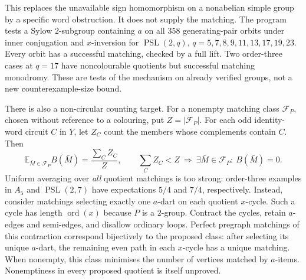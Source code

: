 \documentclass[11pt,a4paper]{article}
\theoremstyle{definition}
\theoremstyle{remark}
\newcommand{\ord}{\operatorname{ord}}
\newcommand{\PSL}{\operatorname{PSL}}
\begin{document}
This replaces the unavailable sign homomorphism on a nonabelian simple group by a specific word obstruction.  It does not supply the matching.  The program  tests a Sylow $2$-subgroup containing $a$ on all $358$ generating-pair orbits under inner conjugation and $x$-inversion for $\PSL(2,q)$, $q=5,7,8,9,11,13,17,19,23$.  Every orbit has a successful matching, checked by a full lift.  Two order-three cases at $q=17$ have noncolourable quotients but successful matching monodromy.  These are tests of the mechanism on already verified groups, not a new counterexample-size bound.

There is also a non-circular counting target.  For a nonempty matching class $\mathcal F_P$, chosen without reference to a colouring, put $Z=|\mathcal F_P|$.  For each odd identity-word circuit $C$ in $Y$, let $Z_C$ count the members whose complements contain $C$.  Then
\[
 \mathbb E_{\bar M\in\mathcal F_P}B(\bar M)
       =\frac{\sum_C Z_C}{Z},\qquad
 \sum_C Z_C<Z\ \Longrightarrow\ \exists\bar M\in\mathcal F_P:\ B(\bar M)=0.
\]
Uniform averaging over \emph{all} quotient matchings is too strong: order-three examples in $A_5$ and $\PSL(2,7)$ have expectations $5/4$ and $7/4$, respectively.  Instead, consider matchings selecting exactly one $a$-dart on each quotient $x$-cycle.  Such a cycle has length $\ord(x)$ because $P$ is a $2$-group.  Contract the cycles, retain $a$-edges and semi-edges, and disallow ordinary loops.  Perfect pregraph matchings of this contraction correspond bijectively to the proposed class: after selecting its unique $a$-dart, the remaining even path in each $x$-cycle has a unique matching.  When nonempty, this class minimises the number of vertices matched by $a$-items.  Nonemptiness in every proposed quotient is itself unproved.
\end{document}
